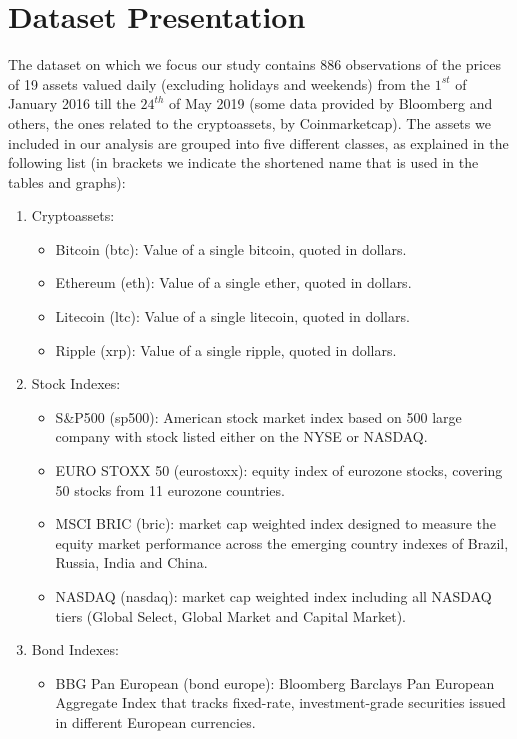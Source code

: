 \section{Dataset  Presentation}
\bigskip
The dataset on which we focus our study contains 886 observations of the prices of 19 assets valued daily (excluding holidays and weekends) from the $1^{st}$ of January 2016 till the $24^{th}$ of May 2019 (some data provided by Bloomberg and others, the ones related to the cryptoassets, by Coinmarketcap).
The assets we included in our analysis are grouped into five different classes, as explained in the following list (in brackets we indicate the shortened name that is used in the tables and graphs):
\begin{enumerate}
    \item Cryptoassets:
    \begin{itemize}
        \item Bitcoin (btc): Value of a single bitcoin, quoted in dollars.
        \item Ethereum (eth): Value of a single ether, quoted in dollars.
        \item Litecoin (ltc): Value of a single litecoin, quoted in dollars.
        \item Ripple (xrp): Value of a single ripple, quoted in dollars.
    \end{itemize}
    \item Stock Indexes:
    \begin{itemize}
        \item S\&P500 (sp500): American stock market index based on 500 large company with stock listed either on the NYSE or NASDAQ.
        \item EURO STOXX 50 (eurostoxx): equity index of eurozone stocks, covering 50 stocks from 11 eurozone countries.
        \item MSCI BRIC (bric): market cap weighted index designed to measure the equity market performance across the emerging country indexes of Brazil, Russia, India and China.
        \item NASDAQ (nasdaq): market cap weighted index including all NASDAQ tiers (Global Select, Global Market and Capital Market).
    \end{itemize}
    \item Bond Indexes:
    \begin{itemize}
        \item BBG Pan European (bond europe): Bloomberg Barclays Pan European Aggregate Index that tracks fixed-rate, investment-grade securities issued in different European currencies.

\end{itemize}
\end{enumerate}
